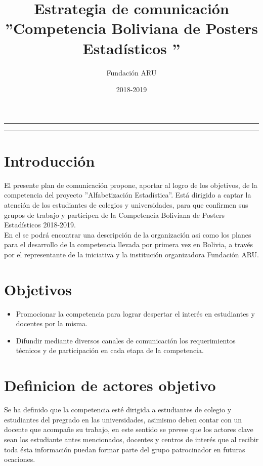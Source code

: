 \documentclass{article}
\title{\textbf{Estrategia de comunicación} \\ ''Competencia Boliviana de Posters Estadísticos ''}
\author{Fundación ARU}
\date{2018-2019 }
\begin{document}
\maketitle

\hrule
\hrule
\newpage

\section{Introducción}

El presente plan de comunicación propone, aportar al logro de los objetivos, de la competencia del proyecto ''Alfabetización Estadística''. Está dirigido a captar la atención de los estudiantes de colegios y universidades, para que confirmen sus grupos de trabajo y participen de la Competencia Boliviana de Posters Estadísticos 2018-2019.\\

En el se podrá encontrar una descripción de la organización asi como los planes para el desarrollo de la competencia llevada por primera vez en Bolivia, a través por el representante de la iniciativa y la institución organizadora Fundación ARU.



\section{Objetivos}


\begin{itemize}
\item Promocionar la competencia para lograr despertar el interés en estudiantes y docentes por la misma. 

\item Difundir mediante diversos canales de comunicación los requerimientos técnicos y de participación en cada etapa de la competencia.
\end{itemize} 

\section{Definicion de actores objetivo}


Se ha definido que la competencia esté dirigida a estudiantes de colegio y estudiantes del pregrado en las universidades, asimismo deben contar con un docente que acompañe su trabajo, en este sentido se prevee que los actores clave sean los estudiante antes mencionados, docentes y centros de interés que al recibir toda ésta información puedan formar parte del grupo patrocinador en futuras ocaciones. \\
\end{document}
